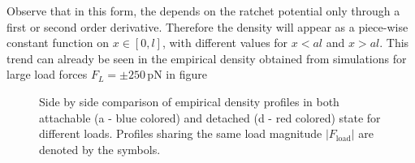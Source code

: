 \documentclass[aps,pre,twocolumn,showpacs,showkeys]{revtex4-1}
\begin{document}
Observe that in this form, the depends on the ratchet potential only through a first or second order derivative. 
Therefore the density will appear as a piece-wise constant function on $x\in[0,l]$, with different values for $x < a l$ and $x > a l $. 
This trend can already be seen in the empirical density obtained from simulations for large load forces $F_L = \pm 250 \, \mathrm{pN}$ in figure %
\begin{figure}[t]
\centering
{}
\caption{Side by side comparison of empirical density profiles in both attachable (a - blue colored) and detached (d - red colored) state for different loads.
Profiles sharing the same load magnitude $|F_\text{load}|$ are denoted by the symbols.
}
\label{Fig: pos_multiplot}
\end{figure}
\end{document}
